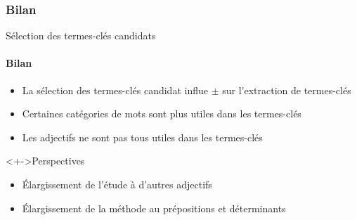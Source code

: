 \subsubsection{Bilan}
  \begin{frame}{Sélection des termes-clés candidats}\framesubtitle{Bilan}
    \begin{itemize}
      \item<+->{La sélection des termes-clés candidat influe $\pm$ sur
                l'extraction de termes-clés}
      \item<+->{Certaines catégories de mots sont plus utiles dans les
                termes-clés}
      \item<+->{Les adjectifs ne sont pas tous utiles dans les termes-clés}
    \end{itemize}

    \begin{block}<+->{Perspectives}
      \begin{itemize}
        \item{Élargissement de l'étude à d'autres adjectifs}
        \item<+->{Élargissement de la méthode au prépositions et déterminants}
      \end{itemize}
    \end{block}
  \end{frame}

